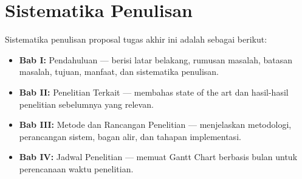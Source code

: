 \section{Sistematika Penulisan}

Sistematika penulisan proposal tugas akhir ini adalah sebagai berikut:

\begin{itemize}
  \item \textbf{Bab I:} Pendahuluan --- berisi latar belakang, rumusan masalah, batasan masalah, tujuan, manfaat, dan sistematika penulisan.
  \item \textbf{Bab II:} Penelitian Terkait --- membahas state of the art dan hasil-hasil penelitian sebelumnya yang relevan.
  \item \textbf{Bab III:} Metode dan Rancangan Penelitian --- menjelaskan metodologi, perancangan sistem, bagan alir, dan tahapan implementasi.
  \item \textbf{Bab IV:} Jadwal Penelitian --- memuat Gantt Chart berbasis bulan untuk perencanaan waktu penelitian.
\end{itemize}
